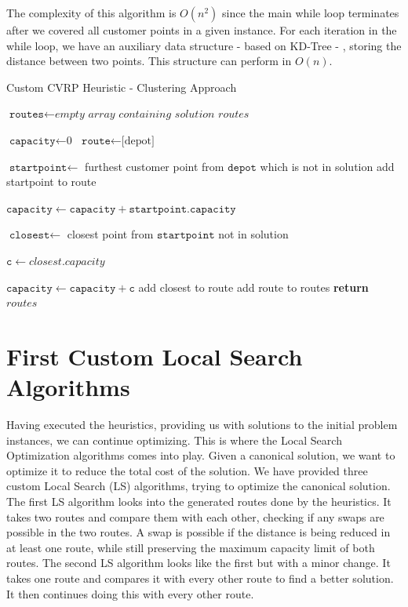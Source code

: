\documentclass[12pt]{article}
\newcommand{\var}{\texttt}
\begin{document}
The complexity of this algorithm is $O(n^2)$ since the main while loop terminates after we covered all customer points in a given instance. For each iteration in the while loop, we have an auxiliary data structure - based on KD-Tree - , storing the distance between two points. This structure can perform in $O(n)$.

\begin{algorithm}[!ht]
	\caption{Custom CVRP Heuristic - Clustering Approach}
	\begin{algorithmic}[1]

	\State $\var{routes} \gets \textit{empty array containing solution routes}$
		
	\State $\var{capacity} \gets \text{0}$
	\State $\var{route} \gets \text{[depot]}$
	
	\State $\var{startpoint} \gets$ furthest customer point from $\var{depot}$ which is not in solution
	\State add startpoint to route

	\State $\var{capacity} \gets \var{capacity} + \var{startpoint.capacity}$
		\While{$\var{capacity} < \var{maxcap} $}

			\State $\var{closest} \gets$ closest point from $\var{startpoint}$ not in solution

			\State $\var{c} \gets closest.capacity$

			\If{$\var{c} + \var{capacity} > \var{maxcap}$}
			\EndIf
			\State $\var{capacity} \gets \var{capacity} + \var{c}$
			\State add closest to route
		\EndWhile
		\State add route to routes
	\EndWhile
	\State \textbf{return} $routes$
	\end{algorithmic}
\end{algorithm}
\newpage
\section{First Custom Local Search Algorithms}
Having executed the heuristics, providing us with solutions to the initial problem instances, we can continue optimizing. This is where the Local Search Optimization algorithms comes into play. 
Given a canonical solution, we want to optimize it to reduce the total cost of the solution. We have provided three custom Local Search (LS) algorithms, trying to optimize the canonical solution. 
\newline
The first LS algorithm looks into the generated routes done by the heuristics. It takes two routes and compare them with each other, checking if any swaps are possible in the two routes. 
A swap is possible if the distance is being reduced in at least one route, while still preserving the maximum capacity limit of both routes. 
The second LS algorithm looks like the first but with a minor change. It takes one route and compares it with every other route to find a better solution. It then continues doing this 
with every other route. 
\end{document}
